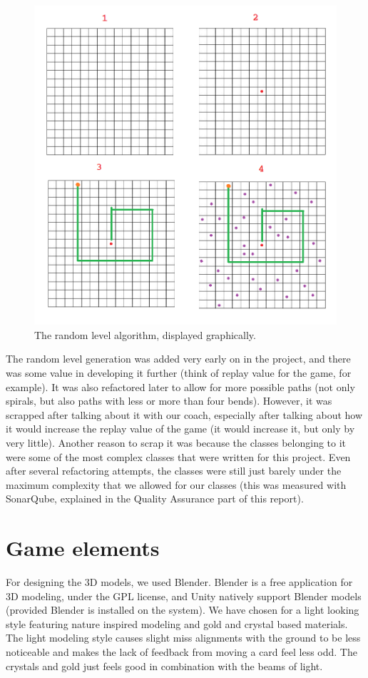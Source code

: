 			\begin{figure}[ht]
				\centering
				\includegraphics[scale = 0.4]{RandomLevelAlgorithm}
				\caption{The random level algorithm, displayed graphically.}
				\label{fig:random}
			\end{figure}
			
			The random level generation was added very early on in the project,
			and there was some value in developing it further (think of replay
			value for the game, for example). It was also refactored later to
			allow for more possible paths (not only spirals, but also paths with
			less or more than four bends). However, it was scrapped after
			talking about it with our coach, especially after talking about how it
			would increase the replay value of the game (it would increase it,
			but only by very little). Another reason to scrap it was because the
			classes belonging to it were some of the most complex classes that were
			written for this project. Even after several refactoring attempts,
			the classes were still just barely under the maximum complexity that we
			allowed for our classes (this was measured with SonarQube, explained
			in the Quality Assurance part of this report). 

	\section{Game elements} \label{sec:graphicaldesign}
		For designing the 3D models, we used Blender. Blender is a free application
		for 3D modeling, under the GPL license, and Unity natively support Blender 
		models (provided Blender is installed on the system). We have chosen for a 
		light looking style featuring nature inspired modeling and gold and crystal 
		based materials. The light modeling style causes slight miss alignments with 
		the ground to be less noticeable and makes the lack of feedback from moving a 
		card feel less odd. The crystals and gold just feels good in combination with 
		the beams of light.
		
